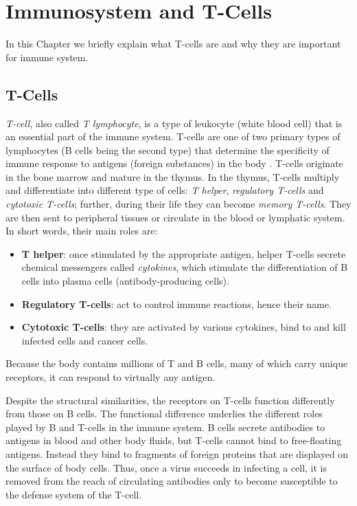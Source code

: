 \chapter{Immunosystem and T-Cells}\label{tcells}
\lhead[\fancyplain{}{\bfseries\thepage}]{\fancyplain{}{\bfseries\rightmark}}

In this Chapter we briefly explain what T-cells are and why they are important for immune system.

\section{T-Cells}

\emph{T-cell}, also called \emph{T lymphocyte}, is a type of leukocyte (white blood cell) that is an essential part of the immune system. T-cells are one of two primary types of lymphocytes (B cells being the second type) that determine the specificity of immune response to antigens (foreign substances) in the body \cite{K39}.
T-cells originate in the bone marrow and mature in the thymus. In the thymus, T-cells multiply and differentiate into different type of cells: \emph{T helper}, \emph{regulatory T-cells} and \emph{cytotoxic T-cells}; further, during their life they can become \emph{memory T-cells}. They are then sent to peripheral tissues or circulate in the blood or lymphatic system. 
In short words, their main roles are:
\begin{itemize}
\centering
\item \textbf{T helper}: once stimulated by the appropriate antigen, helper T-cells secrete chemical messengers called \emph{cytokines}, which stimulate the differentiation of B cells into plasma cells (antibody-producing cells). 

\item \textbf{Regulatory T-cells}: act to control immune reactions, hence their name. 

\item \textbf{Cytotoxic T-cells}: they are activated by various cytokines, bind to and kill infected cells and cancer cells.
\end{itemize} 



Because the body contains millions of T and B cells, many of which carry unique receptors, it can respond to virtually any antigen.

Despite the structural similarities, the receptors on T-cells function differently from those on B cells. The functional difference underlies the different roles played by B and T-cells in the immune system. B cells secrete antibodies to antigens in blood and other body fluids, but T-cells cannot bind to free-floating antigens. Instead they bind to fragments of foreign proteins that are displayed on the surface of body cells. Thus, once a virus succeeds in infecting a cell, it is removed from the reach of circulating antibodies only to become susceptible to the defense system of the T-cell.

